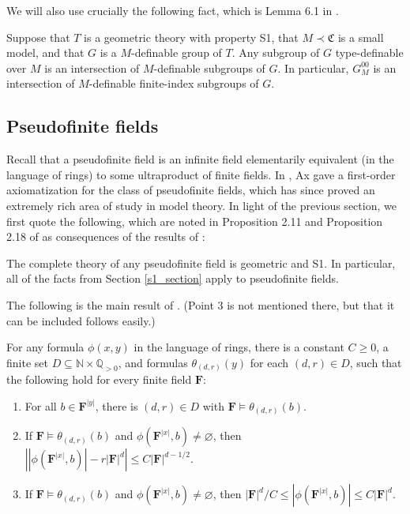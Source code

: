 \documentclass[10pt]{article}
\begin{document}
{We will also use crucially the following fact, which is Lemma 6.1 in \cite{hrushovski_pillay}.

\begin{fact}\label{g0=g00}
    Suppose that $T$ is a geometric theory with property S1, that $M\prec\mathfrak{C}$ is a small model, and that $G$ is a $M$-definable group of $T$. Any subgroup of $G$ type-definable over $M$ is an intersection of $M$-definable subgroups of $G$. In particular, $G^{00}_M$ is an intersection of $M$-definable finite-index subgroups of $G$.
\end{fact}

\subsection{Pseudofinite fields}\label{psf_section}
Recall that a pseudofinite field is an infinite field elementarily equivalent (in the language of rings) to some ultraproduct of finite fields. In \cite{ax}, Ax gave a first-order axiomatization for the class of pseudofinite fields, which has since proved an extremely rich area of study in model theory. In light of the previous section, we first quote the following, which are noted in Proposition 2.11 and Proposition 2.18 of \cite{hrushovski_pillay} as consequences of the results of \cite{chatzidakis_vdd_macintyre}:

\begin{fact}
    The complete theory of any pseudofinite field is geometric and S1. In particular, all of the facts from Section \ref{s1_section} apply to pseudofinite fields.
\end{fact}

The following is the main result of \cite{chatzidakis_vdd_macintyre}. (Point 3 is not mentioned there, but that it can be included follows easily.)

\begin{fact}\label{psf}
    For any formula $\phi(x,y)$ in the language of rings, there is a constant $C\geqslant 0$, a finite set $D\subseteq\mathbb{N}\times\mathbb{Q}_{>0}$, and formulas $\theta_{(d,r)}(y)$ for each $(d,r)\in D$, such that the following hold for every finite field $\mathbf{F}$:
    \begin{enumerate}
        \item For all $b\in\mathbf{F}^{|y|}$, there is $(d,r)\in D$ with $\mathbf{F}\models\theta_{(d,r)}(b)$.
        \item If $\mathbf{F}\models\theta_{(d,r)}(b)$ and $\phi(\mathbf{F}^{|x|},b)\neq\varnothing$, then $\left||\phi(\mathbf{F}^{|x|},b)|-r|\mathbf{F}|^d\right|\leqslant C|\mathbf{F}|^{d-1/2}$.
        \item If $\mathbf{F}\models\theta_{(d,r)}(b)$ and $\phi(\mathbf{F}^{|x|},b)\neq\varnothing$, then $|\mathbf{F}|^d/C\leqslant|\phi(\mathbf{F}^{|x|},b)|\leqslant C|\mathbf{F}|^d$.
    \end{enumerate}
\end{fact}

}
\end{document}
